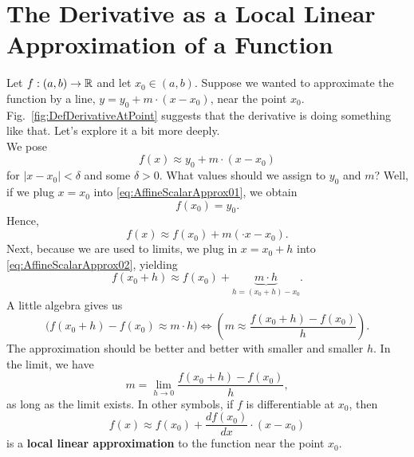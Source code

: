 \bigskip
\section{The Derivative as a Local Linear Approximation of a Function}
\label{sec:LocalLinearApproxFunction}

Let $f:(a, b) \to \mathbb R$ and let $x_0 \in (a, b)$. Suppose we wanted to approximate the function by a line, $y = y_0 + m\cdot (x-x_0)$, near the point $x_0$. Fig.~\ref{fig:DefDerivativeAtPoint} suggests that the derivative is doing something like that. Let's explore it a bit more deeply.\\

We pose
\begin{equation}
    \label{eq:AffineScalarApprox01}
    f(x) \approx  y_0 + m \cdot (x-x_0)
\end{equation}
for $|x-x_0| < \delta$ and some $\delta>0$. What values should we assign to $y_0$ and $m$? Well, if we plug $x =x_0$ into \eqref{eq:AffineScalarApprox01}, we obtain
$$ f(x_0) = y_0.$$
Hence, 
\begin{equation}
    \label{eq:AffineScalarApprox02}
    f(x) \approx  f(x_0) + m( \cdot x-x_0).
\end{equation}
Next, because we are used to limits, we plug in $x=x_0 + h$ into \eqref{eq:AffineScalarApprox02}, yielding
$$ f(x_0 + h) \approx  f(x_0) + \underbrace{m \cdot h}_{h=(x_0 + h)-x_0}.$$
A little algebra gives us
\begin{equation}
    \label{eq:AffineScalarApprox03}
  \big(  f(x_0 + h) - f(x_0) \approx m \cdot h  \big) \iff \left( m \approx  \frac{ f(x_0 + h) - f(x_0) }{h} \right).
\end{equation}
The approximation should be better and better with smaller and smaller $h$. In the limit, we have
\begin{equation}
    \label{eq:AffineScalarApprox04}
m = \lim_{h \to 0} \frac{ f(x_0 + h) - f(x_0) }{h},
\end{equation}
as long as the limit exists. In other symbols, if $f$ is differentiable at $x_0$, then
\begin{equation}
    \label{eq:AffineScalarApprox05}
    f(x) \approx  f(x_0) +  \frac{df(x_0)}{dx} \cdot (x-x_0)
\end{equation}
is a \textbf{local linear approximation} to the function near the point $x_0$.\\

